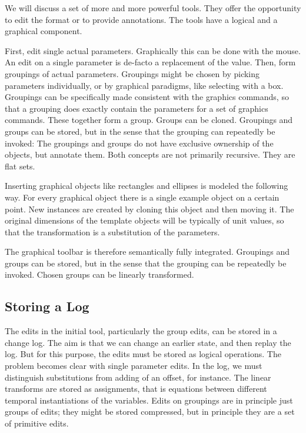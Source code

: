 \documentclass{sig-alternate}
\begin{document}
We will discuss a set of more and more powerful tools. They offer the opportunity to edit the format or to provide annotations. The tools have a logical and a graphical component.


First, edit single actual parameters. Graphically this can be done with the mouse.
An edit on a single parameter is de-facto a replacement of the value.
Then, form groupings of actual parameters. Groupings might be chosen by picking parameters individually, or by 
graphical paradigms, like selecting with a box.
Groupings can be specifically made consistent with the graphics commands, so that a grouping does
exactly contain the parameters for a set of graphics commands. These together form a group.
Groups can be cloned. 
Groupings and groups can be stored, but in the sense that the grouping can repeatedly be invoked:
The groupings and groups do not have exclusive ownership of the objects, but annotate them. 
Both concepts are not primarily recursive. They are flat sets.

Inserting graphical objects like rectangles and ellipses is modeled the following way. For every
graphical object there is a single example object on a certain point. New instances 
are created by cloning this object and then moving it. The original dimensions of the template 
objects will be typically of unit values, so that the transformation is a substitution of the 
parameters. 

The graphical toolbar is therefore semantically fully integrated.
Groupings and groups can be stored, but in the sense that the grouping can be repeatedly be invoked.
Chosen groups can be linearly transformed.

\subsection{Storing a Log}

The edits in the initial tool, particularly the group edits, can be stored in a change log. 
The aim is that we can change an earlier state, and then replay the log.
But for this purpose, the edits must be stored as logical operations. The problem becomes clear
with single parameter edits. In the log, we must distinguish substitutions from adding of an offset,
for instance.
 The linear transforms are stored as 
assignments, that is equations between different temporal instantiations of the variables. Edits on groupings are in principle just groups of edits; they might be stored compressed, but in principle they are a set of primitive edits.
\end{document}
